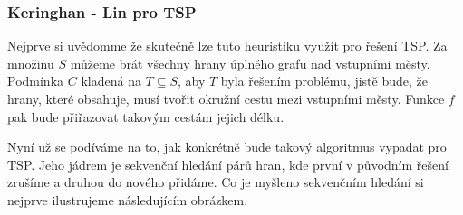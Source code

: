 \documentclass[
  biblatex,
  figures=false,
  glossaries,
  index
]{kidiplom}
\begin{document}
\subsubsection{Keringhan - Lin pro TSP}
Nejprve si uvědomme že skutečně lze tuto heuristiku využít pro řešení TSP. Za množinu $S$ můžeme brát všechny hrany úplného grafu nad vstupními městy. Podmínka $C$ kladená na $T \subseteq S$, aby $T$ byla řešením problému, jistě bude, že hrany, které obsahuje, musí tvořit okružní cestu mezi vstupními městy. Funkce $f$ pak bude přiřazovat takovým cestám jejich délku.

Nyní už se podíváme na to, jak konkrétně bude takový algoritmus vypadat pro TSP. Jeho jádrem je sekvenční hledání párů hran, kde první v původním řešení zrušíme a druhou do nového přidáme. Co je myšleno sekvenčním hledání si nejprve ilustrujeme následujícím obrázkem.
\end{document}
